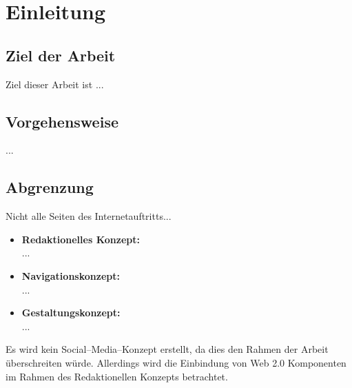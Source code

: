 \section{Einleitung}
\subsection{Ziel der Arbeit}

Ziel dieser Arbeit ist ...

\subsection{Vorgehensweise}

...

\subsection{Abgrenzung}

Nicht alle Seiten des Internetauftritts...

\begin{itemize}
	\item \textbf{Redaktionelles Konzept:}\\
	...
	\item \textbf{Navigationskonzept:}\\
	...
	\item \textbf{Gestaltungskonzept:}\\
	...

\end{itemize}

Es wird kein Social--Media--Konzept erstellt, da dies den Rahmen der Arbeit überschreiten würde. Allerdings wird die Einbindung von Web 2.0 Komponenten im Rahmen des Redaktionellen Konzepts betrachtet.